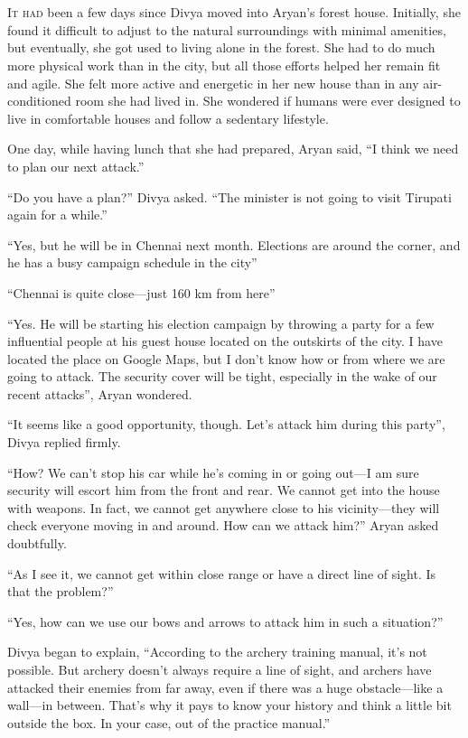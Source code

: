 \chapter{}

\lettrine{I}{t had} been a few days since Divya moved into Aryan's forest 
house. Initially, she found it difficult to adjust to the natural surroundings
with minimal amenities, but eventually, she got used to living alone in the
forest. She had to do much more physical work than in the city, but all those
efforts helped her remain fit and agile. She felt more active and energetic
in her new house than in any air-conditioned room she had lived in. She wondered
if humans were ever designed to live in comfortable houses and follow a
sedentary lifestyle.

One day, while having lunch that she had prepared, Aryan said, “I think we need
to plan our next attack.”

“Do you have a plan?” Divya asked. “The minister is not going to visit
Tirupati again for a while.”

“Yes, but he will be in Chennai next month. Elections are around the corner, and
he has a busy campaign schedule in the city”

“Chennai is quite close—just 160 km from here”

“Yes. He will be starting his election campaign by throwing a party
for a few influential people at his guest house located on the outskirts of the
city. I have located the place on Google Maps, but I don't know how or from
where we are going to attack. The security cover will be tight, especially in
the wake of our recent attacks”, Aryan wondered.

“It seems like a good opportunity, though. Let's attack him during this party”, Divya
replied firmly. 

“How? We can't stop his car while he's coming in or going out—I am sure security
will escort him from the front and rear. We cannot get into the house with
weapons. In fact, we cannot get anywhere close to his vicinity—they will check
everyone moving in and around. How can we attack him?” Aryan asked doubtfully.

“As I see it, we cannot get within close range or have a direct line of
sight. Is that the problem?”

“Yes, how can we use our bows and arrows to attack him in such a
situation?”

Divya began to explain, “According to the archery training manual, it's not possible. But
archery doesn't always require a line of sight, and archers have attacked their
enemies from far away, even if there was a huge obstacle—like a wall—in
between. That's why it pays to know your history and think a little bit outside
the box. In your case, out of the practice manual.”

